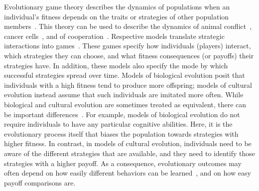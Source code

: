 \documentclass[11pt]{article}
\theoremstyle{plainCl1}
\theoremstyle{plainCl2}
\begin{document}

Evolutionary game theory describes the dynamics of populations when an individual's fitness depends on the traits or strategies of other population members~\cite{hofbauer1998evolutionary, nowak:Nature:2004, hauert2005game}.  
This theory can be used to describe the dynamics of animal conflict~\citep{maynard-smith:Nature:1973}, cancer cells~\citep{Stankova:JAMA:2019}, and of cooperation~\citep{axelrod1981evolution}. 
Respective models translate strategic interactions into games~\cite{smith1982evolution}. 
These games specify how individuals (players) interact, which strategies they can choose, and what fitness consequences (or payoffs) their strategies have. 
In addition, these models also specify the mode by which successful strategies spread over time. 
Models of biological evolution posit that individuals with a high fitness tend to produce more offspring; models of cultural evolution instead assume that such individuals are imitated more often. 
While biological and cultural evolution are sometimes treated as equivalent, there can be important differences~\citep{Wu2015,Smolla:PTRS:2021}. 
For example, models of biological evolution do not require individuals to have any particular cognitive abilities.
Here, it is the evolutionary process itself that biases the population towards strategies with higher fitness. 
In contrast, in models of cultural evolution, individuals need to be aware of the different strategies that are available, and they need to identify those strategies with a higher payoff. 
As a consequence, evolutionary outcomes may often depend on how easily different behaviors can be learned~\citep{Chatterjee:JTB:2012}, and on how easy payoff comparisons are. 

\end{document}
